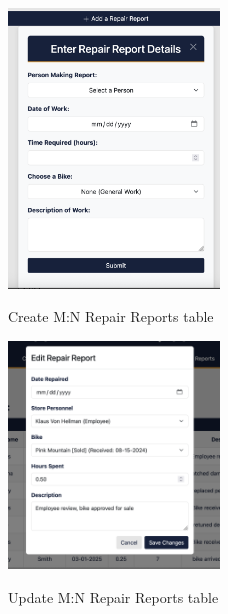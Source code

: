 \documentclass{article}
\begin{document}
\begin{figure}[H]
    \centering
    \caption{Create M:N Repair Reports table}
    \vspace{0.2cm}
    \includegraphics[width=0.5\textwidth]{UI_screenshots/Create_MN_RepairReports.png}
    \label{fig:Create M:N Repair Reports table}
\end{figure}

\begin{figure}[H]
    \centering
    \caption{Update M:N Repair Reports table}
    \vspace{0.2cm}
    \includegraphics[width=0.5\textwidth]{UI_screenshots/Update_MN_RepairReports.png}
    \label{fig:Update M:N Repair Reports table}
\end{figure}
\end{document}
